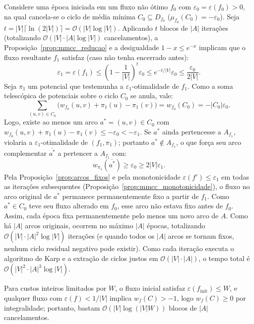 \begin{demonstracao}
Considere uma época iniciada em um fluxo não ótimo $f_0$ com $\varepsilon_0 = \varepsilon(f_0) > 0$, na qual cancela-se o ciclo de média mínima $C_0 \subseteq D_{f_0}$ ($\mu_{f_0}(C_0) = -\varepsilon_0$). Seja $t = |V|\lceil \ln(2|V|) \rceil = \mathcal{O}(|V| \log |V|)$. Aplicando $t$ blocos de $|A|$ iterações (totalizando $\mathcal{O}(|V| \cdot |A| \log |V|)$ cancelamentos), a Proposição~\ref{prop:mmcc_reducao} e a desigualdade $1 - x \le e^{-x}$ implicam que o fluxo resultante $f_1$ satisfaz (caso não tenha encerrado antes):
\begin{equation*}
    \varepsilon_1 = \varepsilon(f_1) \le \left(1 - \frac{1}{|V|}\right)^t \varepsilon_0 \le e^{-t/|V|}\varepsilon_0 \le \frac{\varepsilon_0}{2|V|}.
\end{equation*}
Seja $\pi_1$ um potencial que testemunha a $\varepsilon_1$-otimalidade de $f_1$. Como a soma telescópica de potenciais sobre o ciclo $C_0$ se anula, vale:
\begin{equation*}
    \sum_{(u,v) \in C_0} \bigl(w_{f_0}(u,v) + \pi_1(u) - \pi_1(v)\bigr) = w_{f_0}(C_0) = -|C_0|\varepsilon_0.
\end{equation*}
Logo, existe ao menos um arco $a^* = (u,v) \in C_0$ com $w_{f_0}(u,v) + \pi_1(u) - \pi_1(v) \le -\varepsilon_0 < -\varepsilon_1$. Se $a^*$ ainda pertencesse a $A_{f_1}$, violaria a $\varepsilon_1$-otimalidade de $(f_1, \pi_1)$; portanto $a^* \notin A_{f_1}$, o que força seu arco complementar $\overline{a^*}$ a pertencer a $A_{f_1}$ com:
\begin{equation*}
    w_{\pi_1}(\overline{a^*}) \ge \varepsilon_0 \ge 2|V|\varepsilon_1.
\end{equation*}
Pela Proposição~\ref{prop:arcos_fixos} e pela monotonicidade $\varepsilon(f') \le \varepsilon_1$ em todas as iterações subsequentes (Proposição~\ref{prop:mmcc_monotonicidade}), o fluxo no arco original de $a^*$ permanece permanentemente fixo a partir de $f_1$. Como $a^* \in C_0$ teve seu fluxo alterado em $f_0$, esse arco não estava fixo antes de $f_0$. Assim, cada época fixa permanentemente pelo menos um novo arco de $A$. Como há $|A|$ arcos originais, ocorrem no máximo $|A|$ épocas, totalizando $\mathcal{O}(|V| \cdot |A|^2 \log |V|)$ iterações (e quando todos os $|A|$ arcos se tornam fixos, nenhum ciclo residual negativo pode existir). Como cada iteração executa o algoritmo de Karp e a extração de ciclos justos em $\mathcal{O}(|V| \cdot |A|)$, o tempo total é $\mathcal{O}(|V|^2 \cdot |A|^3 \log |V|)$.

Para custos inteiros limitados por $W$, o fluxo inicial satisfaz $\varepsilon(f_{\text{init}}) \le W$, e qualquer fluxo com $\varepsilon(f) < 1/|V|$ implica $w_f(C) > -1$, logo $w_f(C) \ge 0$ por integralidade; portanto, bastam $\mathcal{O}(|V| \log(|V|W))$ blocos de $|A|$ cancelamentos.
\end{demonstracao}

